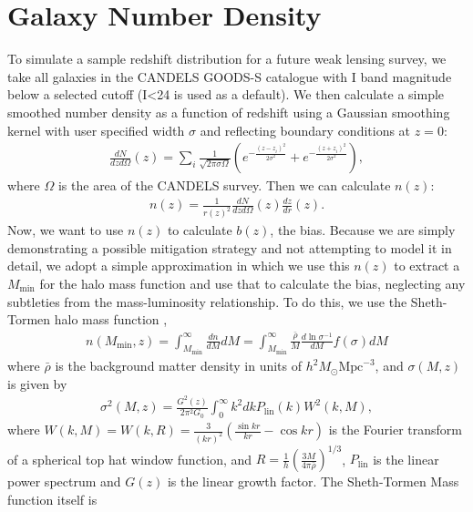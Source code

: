 \documentclass[a4paper,11pt]{article}
\begin{document}
\section{Galaxy Number Density}
\label{sec:nz_candels}
To simulate a sample redshift distribution for a future weak lensing survey, we take all galaxies in the CANDELS\cite{candels_1}\cite{candels_2} GOODS-S catalogue with I band magnitude below a selected cutoff (I<24 is used as a default). We then calculate a simple smoothed number density as a function of redshift using a Gaussian smoothing kernel with user specified width $\sigma$ and reflecting boundary conditions at $z=0$:
\begin{align}\label{candels_dndzofz}
\frac{dN}{dz d\Omega}(z)=\sum_{i}{\frac{1}{\sqrt{2\pi\sigma\Omega}}\left(e^{-\frac{(z-z_i)^2}{2\sigma^2}}+e^{-\frac{(z+z_i)^2}{2\sigma^2}}\right)},
\end{align}
where $\Omega$ is the area of the CANDELS survey. Then we can calculate $n(z)$:
\begin{align}\label{candels_nofz}
n(z) = \frac{1}{r(z)^2}\frac{dN}{dz d\Omega}(z)\frac{dz}{dr}(z).
\end{align}
Now, we want to use $n(z)$ to calculate $b(z)$, the bias. Because we are simply demonstrating a possible mitigation strategy and not attempting to model it in detail, we adopt a simple approximation in which we use this $n(z)$ to extract a $M_\text{min}$ for the halo mass function and use that to calculate the bias, neglecting any subtleties from the mass-luminosity relationship. To do this, we use the Sheth-Tormen halo mass function \cite{sheth_tormen_hmf}\cite{hmf_hu}\cite{hmf_reed},
\begin{align}\label{hmf_f}
n(M_\text{min},z)=\int_{M_\text{min}}^\infty{\frac{dn}{dM}dM}=\int_{M_\text{min}}^\infty\frac{\bar{\rho}}{M}\frac{d \ln{\sigma^{-1}}}{dM}f(\sigma)dM
\end{align}
where $\bar{\rho}$ is the background matter density in units of $h^2 M_\odot \text{Mpc}^{-3}$,
 and $\sigma(M,z)$ is given by 
\begin{align}
\sigma^2(M,z)=\frac{G^2(z)}{2\pi^2G_0}\int_0^\infty k^2 dk P_\text{lin}(k)W^2(k,M),
\end{align}
where $W(k,M)=W(k,R)= \frac{3}{(k r)^2}\left(\frac{\sin{k r}}{k r}-\cos{k r}\right)$ is the Fourier transform of a spherical top hat window function, and $R=\frac{1}{h}(\frac{3M}{4\pi\bar{\rho}})^{1/3}$, $P_\text{lin}$ is the linear power spectrum and $G(z)$ is the linear growth factor. The Sheth-Tormen Mass function itself is
\end{document}
